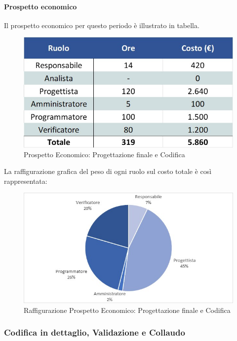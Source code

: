 \paragraph{Prospetto economico}
Il prospetto economico per questo periodo è illustrato in tabella. 
\begin{figure}[H]
	\centerline{\includegraphics[scale=0.7]{img/Preventivo/ProgettazioneFinaleCodificaEconomico.jpg}}
	\caption{Prospetto Economico: Progettazione finale e Codifica}
	\clearpage
\end{figure}
La raffigurazione grafica del peso di ogni ruolo sul costo totale è così rappresentata: 
\begin{figure}[H]
	\centerline{\includegraphics[scale=0.9]{img/Preventivo/Torte/ProgettazioneFinaleCodifica.jpg}}
	\caption{Raffigurazione Prospetto Economico: Progettazione finale e Codifica}
	\clearpage
\end{figure} 
\newpage
\subsubsection{Codifica in dettaglio, Validazione e Collaudo}
